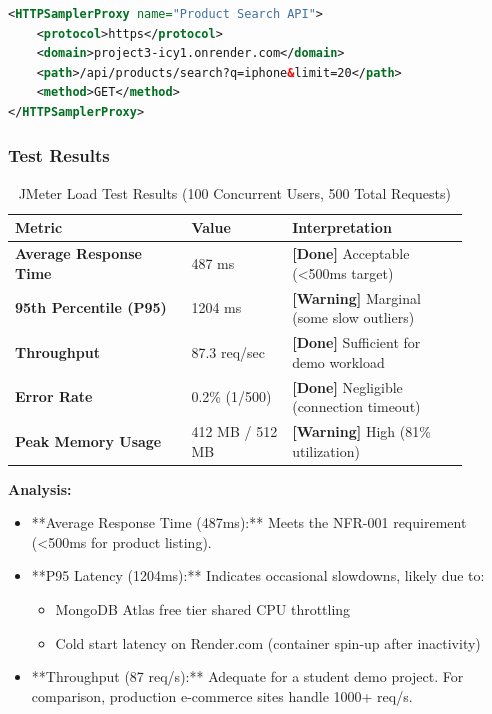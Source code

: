 \documentclass[12pt, a4paper]{report}
\begin{document}
{{\begin{lstlisting}[language=XML, caption=JMeter Test Plan Configuration]
<HTTPSamplerProxy name="Product Search API">
    <protocol>https</protocol>
    <domain>project3-icy1.onrender.com</domain>
    <path>/api/products/search?q=iphone&limit=20</path>
    <method>GET</method>
</HTTPSamplerProxy>
\end{lstlisting}

\subsubsection{Test Results}

\begin{table}[H]
\centering
\caption{JMeter Load Test Results (100 Concurrent Users, 500 Total Requests)}
\label{tab:jmeter_results}
\begin{tabular}{@{}p{0.35\linewidth}p{0.20\linewidth}p{0.35\linewidth}@{}}
\toprule
\textbf{Metric} & \textbf{Value} & \textbf{Interpretation} \\
\midrule
\textbf{Average Response Time} & 487 ms & \textbf{[Done]} Acceptable (\textless 500ms target) \\
\textbf{95th Percentile (P95)} & 1204 ms & \textbf{[Warning]} Marginal (some slow outliers) \\
\textbf{Throughput} & 87.3 req/sec & \textbf{[Done]} Sufficient for demo workload \\
\textbf{Error Rate} & 0.2\% (1/500) & \textbf{[Done]} Negligible (connection timeout) \\
\textbf{Peak Memory Usage} & 412 MB / 512 MB & \textbf{[Warning]} High (81\% utilization) \\
\bottomrule
\end{tabular}
\end{table}

\textbf{Analysis:}
\begin{itemize}
    \item **Average Response Time (487ms):** Meets the NFR-001 requirement (\textless 500ms for product listing).
    \item **P95 Latency (1204ms):** Indicates occasional slowdowns, likely due to:
    \begin{itemize}
        \item MongoDB Atlas free tier shared CPU throttling
        \item Cold start latency on Render.com (container spin-up after inactivity)
    \end{itemize}
    \item **Throughput (87 req/s):** Adequate for a student demo project. For comparison, production e-commerce sites handle 1000+ req/s.
\end{itemize}

}}
\end{document}
